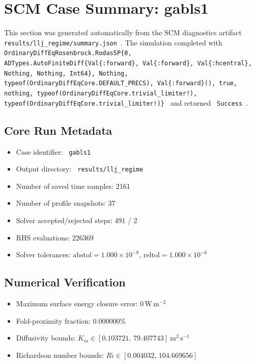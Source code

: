 \section{SCM Case Summary: gabls1}
\label{sec:scm_case_llj_regime_gabls1_150x2m_18h_report}

This section was generated automatically from the SCM diagnostics artifact
\texttt{ results/llj\_regime/summary.json }. The simulation completed with \texttt{ OrdinaryDiffEqRosenbrock.Rodas5P\{0, ADTypes.AutoFiniteDiff\{Val\{:forward\}, Val\{:forward\}, Val\{:hcentral\}, Nothing, Nothing, Int64\}, Nothing, typeof(OrdinaryDiffEqCore.DEFAULT\_PRECS), Val\{:forward\}(), true, nothing, typeof(OrdinaryDiffEqCore.trivial\_limiter!), typeof(OrdinaryDiffEqCore.trivial\_limiter!)\} }
and returned \texttt{ Success }.

\subsection{Core Run Metadata}
\begin{itemize}
  \item Case identifier: \texttt{ gabls1 }
  \item Output directory: \texttt{ results/llj\_regime }
  \item Number of saved time samples: 2161
  \item Number of profile snapshots: 37
  \item Solver accepted/rejected steps: 491 / 2
  \item RHS evaluations: 226369
  \item Solver tolerances: $\mathrm{abstol}=1.000 \times 10^{-8}$, $\mathrm{reltol}=1.000 \times 10^{-6}$
\end{itemize}

\subsection{Numerical Verification}
\begin{itemize}
  \item Maximum surface energy closure error:
  $0\,\mathrm{W\,m^{-2}}$
  \item Fold-proximity fraction:
  $0.000000\%$
  \item Diffusivity bounds:
  $K_m \in [0.103721,\,79.407743]~\mathrm{m^2\,s^{-1}}$
  \item Richardson number bounds:
  $Ri \in [0.004032,\,104.669656]$
\end{itemize}

